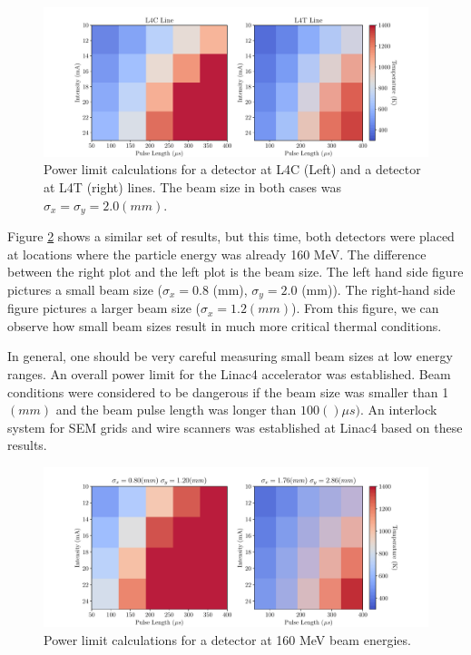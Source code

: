 \begin{figure}[h]
    \centering
    \includegraphics[width=1.0\columnwidth]{Figure_ThermalLimitsSquares/EnergyCompa.pdf}
    \caption{Power limit calculations for a detector at L4C (Left) and a detector at L4T (right) lines. The beam size in both cases was $\sigma_x = \sigma_y = 2.0 (mm)$.}
    \label{fig:EnerCompa}
\end{figure}

Figure \ref{fig:SigmaComparison} shows a similar set of results, but this time, both detectors were placed at locations where the particle energy was already 160 MeV. The difference between the right plot and the left plot is the beam size. The left hand side figure pictures a small beam size ($\sigma_x = 0.8$ (mm), $\sigma_y = 2.0$ (mm)). The right-hand side figure pictures a larger beam size ($\sigma_x = 1.2 (mm)$). From this figure, we can observe how small beam sizes result in much more critical thermal conditions. 

In general, one should be very careful measuring small beam sizes at low energy ranges. An overall power limit for the Linac4 accelerator was established. Beam conditions were considered to be dangerous if the beam size was smaller than 1 $(mm)$ and the beam pulse length was longer than $100 ()\mu s)$. An interlock system for SEM grids and wire scanners was established at Linac4 based on these results. 

\begin{figure}[h]
    \centering
    \includegraphics[width=1.0\columnwidth]{Figure_ThermalLimitsSquares/SigmaCompa.pdf}
    \caption{Power limit calculations for a detector at 160 MeV beam energies.}
    \label{fig:SigmaComparison}
\end{figure}

